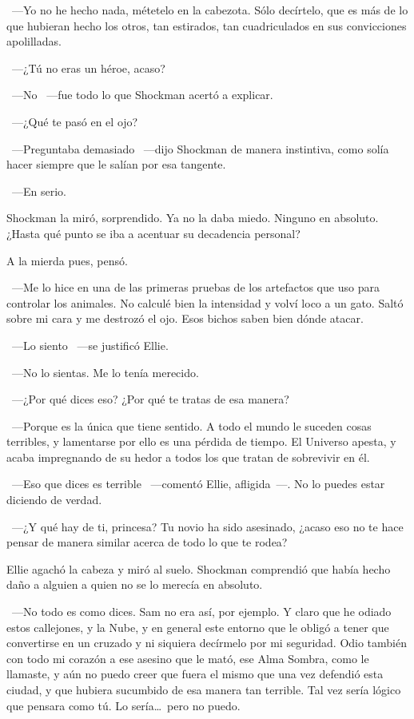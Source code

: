 ~---Yo no he hecho nada, métetelo en la cabezota. Sólo decírtelo, que es más de lo que hubieran hecho los otros, tan estirados, tan cuadriculados en sus convicciones apolilladas.

~---¿Tú no eras un héroe, acaso?

~---No ~---fue todo lo que Shockman acertó a explicar.

~---¿Qué te pasó en el ojo?

~---Preguntaba demasiado ~---dijo Shockman de manera instintiva, como solía hacer siempre que le salían por esa tangente.

~---En serio.

Shockman la miró, sorprendido. Ya no la daba miedo. Ninguno en absoluto. ¿Hasta qué punto se iba a acentuar su decadencia personal?

A la mierda pues, pensó.

~---Me lo hice en una de las primeras pruebas de los artefactos que uso para controlar los animales. No calculé bien la intensidad y volví loco a un gato. Saltó sobre mi cara y me destrozó el ojo. Esos bichos saben bien dónde atacar.

~---Lo siento ~---se justificó Ellie.

~---No lo sientas. Me lo tenía merecido.

~---¿Por qué dices eso? ¿Por qué te tratas de esa manera?

~---Porque es la única que tiene sentido. A todo el mundo le suceden cosas terribles, y lamentarse por ello es una pérdida de tiempo. El Universo apesta, y acaba impregnando de su hedor a todos los que tratan de sobrevivir en él.

~---Eso que dices es terrible ~---comentó Ellie, afligida~---. No lo puedes estar diciendo de verdad.

~---¿Y qué hay de ti, princesa? Tu novio ha sido asesinado, ¿acaso eso no te hace pensar de manera similar acerca de todo lo que te rodea?

Ellie agachó la cabeza y miró al suelo. Shockman comprendió que había hecho daño a alguien a quien no se lo merecía en absoluto.

~---No todo es como dices. Sam no era así, por ejemplo. Y claro que he odiado estos callejones, y la Nube, y en general este entorno que le obligó a tener que convertirse en un cruzado y ni siquiera decírmelo por mi seguridad. Odio también con todo mi corazón a ese asesino que le mató, ese Alma Sombra, como le llamaste, y aún no puedo creer que fuera el mismo que una vez defendió esta ciudad, y que hubiera sucumbido de esa manera tan terrible. Tal vez sería lógico que pensara como tú. Lo sería\dots\ pero no puedo.


